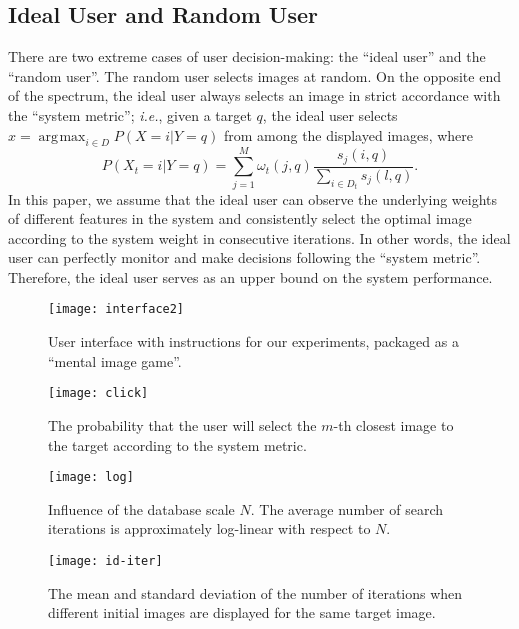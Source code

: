 \documentclass[journal]{IEEEtran}
\DeclareMathOperator*{\argmax}{\arg\!\max}
\begin{document}
\subsection{Ideal User and Random User}\label{subsec::ideal}
There are two extreme cases of user decision-making: the ``ideal user'' and the ``random user''. The random user selects images at random. On the opposite end of the spectrum, the ideal user always selects an image in strict accordance with the ``system metric''; \textit{i.e.}, given a target $q$, the ideal user selects $x=\argmax_{i\in D}P(X=i|Y=q)$ from among the displayed images, where
\begin{equation}
P(X_t=i|Y=q)=\sum_{j=1}^M \omega_t(j,q)\frac{s_j(i,q)}{\sum_{i\in D_t}s_j(l,q)}.
\end{equation}
In this paper, we assume that the ideal user can observe the underlying weights of different features in the system and consistently select the optimal image according to the system weight in consecutive iterations. In other words, the ideal user can perfectly monitor and make decisions following the ``system metric''. Therefore, the ideal user serves as an upper bound on the system performance.


\begin{figure*}[t]
\centering
\texttt{[image: interface2]}
\caption{User interface with instructions for our experiments, packaged as a ``mental image game''.}
\label{fig::gui}
\end{figure*}


\begin{figure*}[!t]
\begin{minipage}{0.32\textwidth}
\centering
\texttt{[image: click]}
\caption{The probability that the user will select the $m$-th closest image to the target according to the system metric.}
\label{fig::click}
\end{minipage}
\hfill
\begin{minipage}{0.32\textwidth}
\centering
\texttt{[image: log]}
\caption{Influence of the database scale $N$. The average number of search iterations is approximately log-linear with respect to $N$.}
\label{fig::scale}
\end{minipage}
\hfill
\begin{minipage}{0.32\textwidth}
\centering
\texttt{[image: id-iter]}
\caption{The mean and standard deviation of the number of iterations when different initial images are displayed for the same target image.}
\label{fig::weight}
\end{minipage}
\end{figure*}
\end{document}
